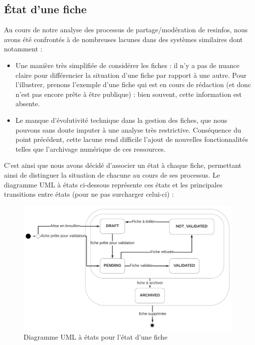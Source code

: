 \pagebreak
\subsection*{État d'une \gls{fiche}}

Au cours de notre analyse des processus de partage/modération de \glspl{resinfo}, nous avons été confrontés à de nombreuses lacunes dans des systèmes similaires dont notamment :
\begin{itemize}
    \item Une manière très simplifiée de considérer les \glspl{fiche} : il n'y a pas de nuance claire pour différencier la situation d'une \gls{fiche} par rapport à une autre. Pour l'illustrer, prenons l'exemple d'une \gls{fiche} qui est en cours de rédaction (et donc n'est pas encore prête à être publique) : bien souvent, cette information est absente.
    \item Le manque d'évolutivité technique dans la gestion des \glspl{fiche}, que nous pouvons sans doute imputer à une analyse très restrictive. Conséquence du point précédent, cette lacune rend difficile l'ajout de nouvelles fonctionnalités telles que l'archivage numérique de ces ressources. 
\end{itemize}

C'est ainsi que nous avons décidé d'associer un état à chaque \gls{fiche}, permettant ainsi de distinguer la situation de chacune au cours de ses processus. Le diagramme UML à états ci-dessous représente ces états et les principales transitions entre états (pour ne pas surcharger celui-ci) :

\begin{figure}[H]
    \includegraphics[width=\textwidth,height=\textheight,keepaspectratio]{images/StateFiches.png}
    \centering
    \caption{Diagramme UML à états pour l'état d'une \gls{fiche}}
    \label{pic:stateDiagramForFiches}
\end{figure}

